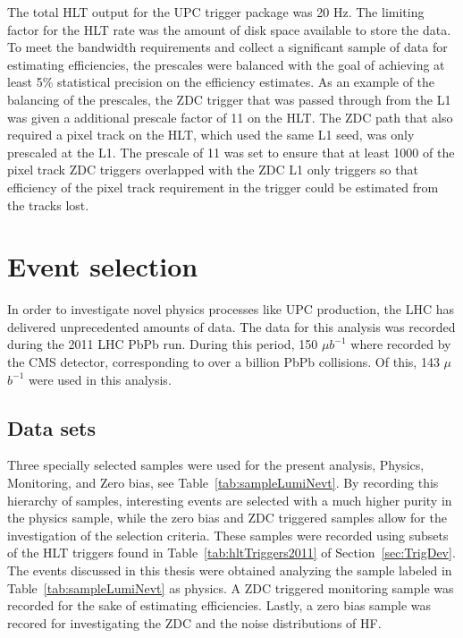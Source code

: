       The total HLT output for the UPC trigger package was 20 Hz. 
      The limiting factor for the HLT rate was the amount of disk space 
        available to store the data. 
      To meet the bandwidth requirements and collect a significant sample
        of data for estimating efficiencies, the prescales were balanced with 
        the goal of achieving at least 5\% statistical precision on the 
        efficiency estimates. 
      As an example of the balancing of the prescales, the  ZDC trigger that 
        was passed through from the L1 was given a additional prescale factor 
        of 11 on the HLT.
      The ZDC path that also required a pixel track on the HLT, which used 
        the same L1 seed, was only prescaled at the L1.
      The prescale of 11 was set to ensure that at least 1000 of the pixel track 
        ZDC triggers overlapped with the ZDC L1 only triggers so that efficiency
        of the pixel track requirement in the trigger could be estimated from 
        the tracks lost. 

  \section{\label{sec:DataSetEvSel} Event selection}
    In order to investigate novel physics processes like UPC \JPsi{} 
     production, the LHC has delivered unprecedented amounts of data.
    The data for this analysis was recorded during the 2011 LHC PbPb run. 
    During this period, 150 $\mu$$b^{-1}$ where recorded by the CMS detector,
      corresponding to over a billion PbPb collisions. 
    Of this, 143 $\mu$$b^{-1}$ were used in this analysis.
  
    \subsection{Data sets}
      Three specially selected samples were used for the present analysis, 
        Physics, Monitoring, and Zero bias, see Table~\ref{tab:sampleLumiNevt}.
      By recording this hierarchy of samples, interesting events are selected 
        with a much higher purity in the physics sample, while the zero bias and 
        ZDC triggered samples allow for the investigation of the selection 
        criteria. 
      These samples were recorded using subsets of the HLT triggers found in 
        Table~\ref{tab:hltTriggers2011} of Section~\ref{sec:TrigDev}.
      The \JPsi{} events discussed in this thesis were obtained analyzing the 
        sample labeled in Table~\ref{tab:sampleLumiNevt} as physics.
      A ZDC triggered monitoring sample was recorded for the sake of estimating
        efficiencies.
      Lastly, a zero bias sample was recored for investigating the ZDC and the 
        noise distributions of HF.
  
